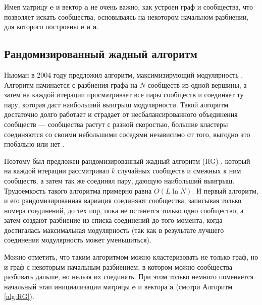 \documentclass{matmex-diploma}
\begin{document}
Имея матрицу $\mathbf{e}$ и вектор $\mathbf{a}$ не очень важно, как устроен граф и сообщества, что позволяет искать сообщества, основываясь на некотором начальном разбиении, для которого построены $\mathbf{e}$ и $\mathbf{a}$.

\subsection{Рандомизированный жадный алгоритм}
Ньюман в 2004 году предложил алгоритм, максимизирующий модулярность \cite{Newman:2004}. Алгоритм начинается с разбиения графа на $N$ сообществ из одной вершины, а затем на каждой итерации просматривает все пары сообществ и соединяет ту пару, которая даст наибольший выигрыш модулярности. Такой алгоритм достаточно долго работает и страдает от несбалансированного объединения сообществ --- сообщества растут с разной скоростью, большие кластеры соединяются со своими небольшими соседями независимо от того, выгодно это глобально или нет \cite{Ovelgoenne&Geyer-Schulz:2012a}.

Поэтому был предложен рандомизированный жадный алгоритм (RG) \cite{Ovelgoenne&Geyer-Schulz:2010}, который на каждой итерации рассматривал $k$ случайных сообществ и смежных к ним сообществ, а затем так же соединял пару, дающую наибольший выигрыш. Трудоёмкость такого алгоритма примерно равна $O(L \ln N)$. И первый алгоритм, и его рандомизированная вариация соединяют сообщества, записывая только номера соединений, до тех пор, пока не останется только одно сообщество, а затем создают разбиение из списка соединений до того момента, когда достигалась максимальная модулярность (так как в результате лучшего соединения модулярность может уменьшиться).

Можно отметить, что таким алгоритмом можно кластеризовать не только граф, но и граф с некоторым начальным разбиением, в котором можно сообщества разбивать дальше, но нельзя их соединять. При этом только немного поменяется начальный этап инициализации матрицы $\mathbf{e}$ и вектора $\mathbf{a}$ (смотри Алгоритм \ref{alg:RG}).
\end{document}
